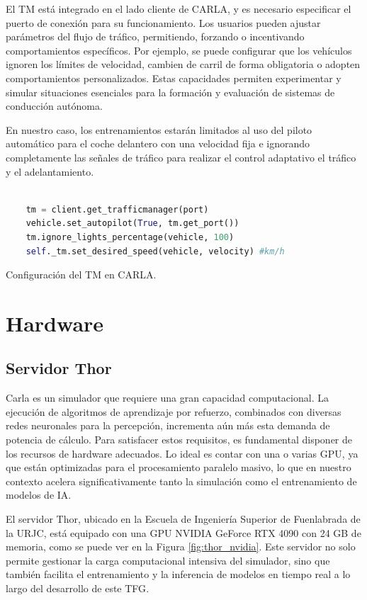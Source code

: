 El \ac{TM} está integrado en el lado cliente de CARLA, y es necesario especificar el puerto de conexión para su funcionamiento. Los usuarios pueden ajustar parámetros del flujo de tráfico, permitiendo, forzando o incentivando comportamientos específicos. Por ejemplo, se puede configurar que los vehículos ignoren los límites de velocidad, cambien de carril de forma obligatoria o adopten comportamientos personalizados. Estas capacidades permiten experimentar y simular situaciones esenciales para la formación y evaluación de sistemas de conducción autónoma.

En nuestro caso, los entrenamientos estarán limitados al uso del piloto automático para el coche delantero con una velocidad fija e ignorando completamente las señales de tráfico para realizar el control adaptativo el tráfico y el adelantamiento. 
\begin{code}[h]
	\begin{lstlisting}[language=python]
	
	tm = client.get_trafficmanager(port)
	vehicle.set_autopilot(True, tm.get_port())  
	tm.ignore_lights_percentage(vehicle, 100) 
	self._tm.set_desired_speed(vehicle, velocity) #km/h
\end{lstlisting}
\caption[Configuración del \ac{TM} en CARLA]{Configuración del \ac{TM} en CARLA.}
\label{cod:tm_carla}
\end{code}

\section{Hardware}
\label{sec:hw}
\subsection{Servidor Thor}
\label{sec:thor}

Carla es un simulador que requiere una gran capacidad computacional. La ejecución de algoritmos de aprendizaje por refuerzo, combinados con diversas redes neuronales para la percepción, incrementa aún más esta demanda de potencia de cálculo. Para satisfacer estos requisitos, es fundamental disponer de los recursos de hardware adecuados. Lo ideal es contar con una o varias \ac{GPU}, ya que están optimizadas para el procesamiento paralelo masivo, lo que en nuestro contexto acelera significativamente tanto la simulación como el entrenamiento de modelos de \ac{IA}. 

El servidor Thor, ubicado en la Escuela de Ingeniería Superior de Fuenlabrada de la \ac{URJC}, está equipado con una GPU NVIDIA GeForce RTX 4090 con 24 GB de memoria, como se puede ver en la Figura \ref{fig:thor_nvidia}. Este servidor no solo permite gestionar la carga computacional intensiva del simulador, sino que también facilita el entrenamiento y la inferencia de modelos en tiempo real a lo largo del desarrollo de este \ac{TFG}.

